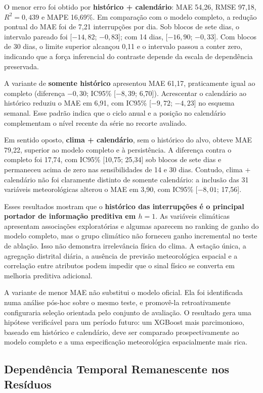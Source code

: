 O menor erro foi obtido por \textbf{histórico + calendário}: MAE 54,26, RMSE 97,18, $R^2=0{,}439$ e MAPE 16,69\%. Em comparação com o modelo completo, a redução pontual do MAE foi de 7,21 interrupções por dia. Sob blocos de sete dias, o intervalo pareado foi [$-14,82$; $-0,83$]; com 14 dias, [$-16,90$; $-0,33$]. Com blocos de 30 dias, o limite superior alcançou 0,11 e o intervalo passou a conter zero, indicando que a força inferencial do contraste depende da escala de dependência preservada.

A variante de \textbf{somente histórico} apresentou MAE 61,17, praticamente igual ao completo (diferença $-0,30$; IC95\% [$-8,39$; 6,70]). Acrescentar o calendário ao histórico reduziu o MAE em 6,91, com IC95\% [$-9,72$; $-4,23$] no esquema semanal. Esse padrão indica que o ciclo anual e a posição no calendário complementam o nível recente da série no recorte avaliado.

Em sentido oposto, \textbf{clima + calendário}, sem o histórico do alvo, obteve MAE 79,22, superior ao modelo completo e à persistência. A diferença contra o completo foi 17,74, com IC95\% [10,75; 25,34] sob blocos de sete dias e permaneceu acima de zero nas sensibilidades de 14 e 30 dias. Contudo, clima + calendário não foi claramente distinto de somente calendário: a inclusão das 31 variáveis meteorológicas alterou o MAE em 3,90, com IC95\% [$-8,01$; 17,56].

Esses resultados mostram que o \textbf{histórico das interrupções é o principal portador de informação preditiva em $h=1$}. As variáveis climáticas apresentam associações exploratórias e algumas aparecem no ranking de ganho do modelo completo, mas o grupo climático não forneceu ganho incremental no teste de ablação. Isso não demonstra irrelevância física do clima. A estação única, a agregação distrital diária, a ausência de previsão meteorológica espacial e a correlação entre atributos podem impedir que o sinal físico se converta em melhoria preditiva adicional.

A variante de menor MAE não substitui o modelo oficial. Ela foi identificada numa análise pós-hoc sobre o mesmo teste, e promovê-la retroativamente configuraria seleção orientada pelo conjunto de avaliação. O resultado gera uma hipótese verificável para um período futuro: um XGBoost mais parcimonioso, baseado em histórico e calendário, deve ser comparado prospectivamente ao modelo completo e a uma especificação meteorológica espacialmente mais rica.

\subsection{Dependência Temporal Remanescente nos Resíduos}\label{sec:resultados_residuos_temporais}

